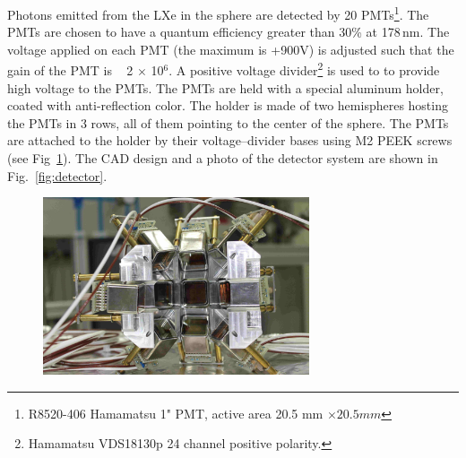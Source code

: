Photons emitted from the LXe in the sphere are detected by 20  PMTs\footnote{R8520-406 Hamamatsu 1" PMT, active area 20.5 mm $\times 20.5 mm$}. 
The PMTs are chosen to have a quantum efficiency greater than 30\% at 178\,nm. The voltage applied on each PMT (the maximum is +900V) is adjusted such that the gain of the PMT is ~ 2 $\times$ 10$^6$. A positive voltage divider\footnote{Hamamatsu VDS18130p 24 channel positive polarity.} is used to to provide high voltage to the PMTs. 
The PMTs are held with a special aluminum holder, coated with anti-reflection color. 
The holder is made of two hemispheres hosting the PMTs in 3 rows, all of them pointing to the 
center of the sphere. The PMTs are attached to the holder by their voltage--divider bases using M2 PEEK screws (see Fig~\ref{fig:pmtholder}). 
The CAD design and a photo of the detector system are shown 
in Fig.~\ref{fig:detector}.

\begin{figure}[]
   \centering
   \includegraphics[width=0.7\textwidth]{fig/PMTholder.JPG}
   \label{fig:pmtholder}
\end{figure}

